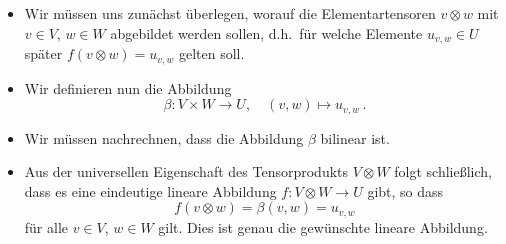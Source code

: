 \begin{itemize}
  \item
    Wir müssen uns zunächst überlegen, worauf die Elementartensoren $v \otimes w$ mit $v \in V$, $w \in W$ abgebildet werden sollen, d.h.\ für welche Elemente $u_{v,w} \in U$ später $f(v \otimes w) = u_{v,w}$ gelten soll.
  \item
    Wir definieren nun die Abbildung
    \[
              \beta
      \colon  V \times W
      \to     U,
      \quad   (v,w)
      \mapsto u_{v,w} \,.
    \]
  \item
    Wir müssen nachrechnen, dass die Abbildung $\beta$ bilinear ist.
  \item
    Aus der universellen Eigenschaft des Tensorprodukts $V \otimes W$ folgt schließlich, dass es eine eindeutige lineare Abbildung $f \colon V \otimes W \to U$ gibt, so dass
    \[
        f(v \otimes w)
      = \beta(v,w)
      = u_{v,w}
    \]
    für alle $v \in V$, $w \in W$ gilt.
    Dies ist genau die gewünschte lineare Abbildung.
\end{itemize}


